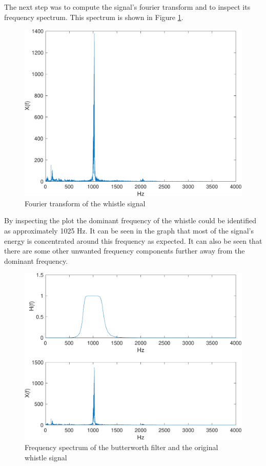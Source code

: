 \documentclass{IEEEtran}
\begin{document}
The next step was to compute the signal's fourier transform and to
inspect its frequency spectrum. This spectrum is shown in Figure
\ref{1:whistle_fft}.

\begin{figure}[h]
  \centering
  \captionsetup{justification=centering}

  \includegraphics[width=0.8\columnwidth]{pictures/whistle_fft.pdf}
  \caption{Fourier transform of the whistle signal}
  \label{1:whistle_fft}

\end{figure}

By inspecting the plot the dominant frequency of the whistle could be
identified as approximately 1025 Hz. It can be seen in the graph that
most of the signal's energy is concentrated around this frequency as
expected. It can also be seen that there are some other unwanted
frequency components further away from the dominant frequency.

\begin{figure}[h]
  \centering
  \captionsetup{justification=centering}

  \includegraphics[width=0.8\columnwidth]{pictures/whistle_filter.pdf}
  \caption{Frequency spectrum of the butterworth filter and the original
  whistle signal}
  \label{1:whistle_filter}
\end{figure}
\end{document}
